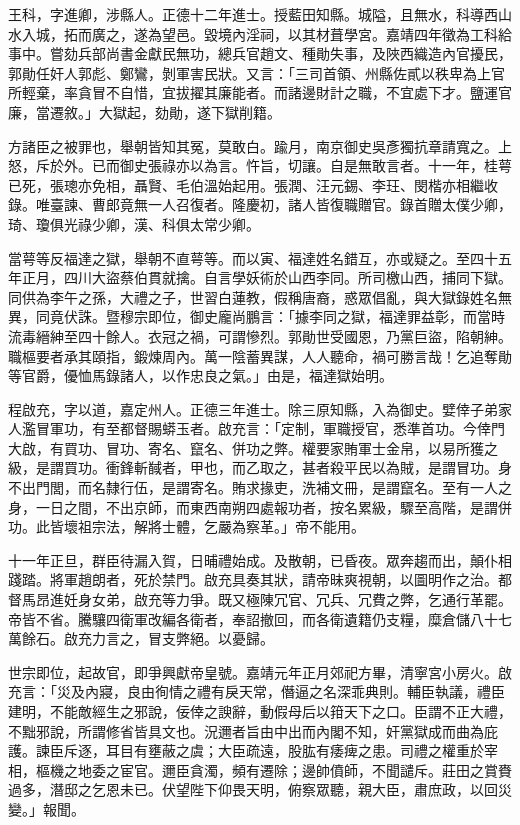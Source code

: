 \begin{pinyinscope}
王科，字進卿，涉縣人。正德十二年進士。授藍田知縣。城隘，且無水，科導西山水入城，拓而廣之，遂為望邑。毀境內淫祠，以其材葺學宮。嘉靖四年徵為工科給事中。嘗劾兵部尚書金獻民無功，總兵官趙文、種勛失事，及陜西織造內官擾民，郭勛任奸人郭彪、鄭鸞，剝軍害民狀。又言：「三司首領、州縣佐貳以秩卑為上官所輕棄，率貪冒不自惜，宜拔擢其廉能者。而諸邊財計之職，不宜處下才。鹽運官廉，當遷敘。」大獄起，劾勛，遂下獄削籍。

方諸臣之被罪也，舉朝皆知其冤，莫敢白。踰月，南京御史吳彥獨抗章請寬之。上怒，斥於外。已而御史張祿亦以為言。忤旨，切讓。自是無敢言者。十一年，桂萼已死，張璁亦免相，聶賢、毛伯溫始起用。張潤、汪元錫、李玨、閔楷亦相繼收錄。唯臺諫、曹郎竟無一人召復者。隆慶初，諸人皆復職贈官。錄首贈太僕少卿，琦、瓊俱光祿少卿，漢、科俱太常少卿。

當萼等反福達之獄，舉朝不直萼等。而以寅、福達姓名錯互，亦或疑之。至四十五年正月，四川大盜蔡伯貫就擒。自言學妖術於山西李同。所司檄山西，捕同下獄。同供為李午之孫，大禮之子，世習白蓮教，假稱唐裔，惑眾倡亂，與大獄錄姓名無異，同竟伏誅。暨穆宗即位，御史龐尚鵬言：「據李同之獄，福達罪益彰，而當時流毒縉紳至四十餘人。衣冠之禍，可謂慘烈。郭勛世受國恩，乃黨巨盜，陷朝紳。職樞要者承其頤指，鍛煉周內。萬一陰蓄異謀，人人聽命，禍可勝言哉！乞追奪勛等官爵，優恤馬錄諸人，以作忠良之氣。」由是，福達獄始明。

程啟充，字以道，嘉定州人。正德三年進士。除三原知縣，入為御史。嬖倖子弟家人濫冒軍功，有至都督賜蟒玉者。啟充言：「定制，軍職授官，悉準首功。今倖門大啟，有買功、冒功、寄名、竄名、併功之弊。權要家賄軍士金帛，以易所獲之級，是謂買功。衝鋒斬馘者，甲也，而乙取之，甚者殺平民以為賊，是謂冒功。身不出門閭，而名隸行伍，是謂寄名。賄求掾吏，洗補文冊，是謂竄名。至有一人之身，一日之間，不出京師，而東西南朔四處報功者，按名累級，驟至高階，是謂併功。此皆壞祖宗法，解將士體，乞嚴為察革。」帝不能用。

十一年正旦，群臣待漏入賀，日晡禮始成。及散朝，已昏夜。眾奔趨而出，顛仆相踐踏。將軍趙朗者，死於禁門。啟充具奏其狀，請帝昧爽視朝，以圖明作之治。都督馬昂進妊身女弟，啟充等力爭。既又極陳冗官、冗兵、冗費之弊，乞通行革罷。帝皆不省。騰驤四衛軍改編各衛者，奉詔撤回，而各衛遺籍仍支糧，糜倉儲八十七萬餘石。啟充力言之，冒支弊絕。以憂歸。

世宗即位，起故官，即爭興獻帝皇號。嘉靖元年正月郊祀方畢，清寧宮小房火。啟充言：「災及內寢，良由徇情之禮有戾天常，僭逼之名深乖典則。輔臣執議，禮臣建明，不能敵經生之邪說，佞倖之諛辭，動假母后以箝天下之口。臣謂不正大禮，不黜邪說，所謂修省皆具文也。況邇者旨由中出而內閣不知，奸黨獄成而曲為庇護。諫臣斥逐，耳目有壅蔽之虞；大臣疏遠，股肱有痿痺之患。司禮之權重於宰相，樞機之地委之宦官。邇臣貪濁，頻有遷除；邊帥僨師，不聞譴斥。莊田之賞賚過多，潛邸之乞恩未已。伏望陛下仰畏天明，俯察眾聽，親大臣，肅庶政，以回災變。」報聞。


\end{pinyinscope}
